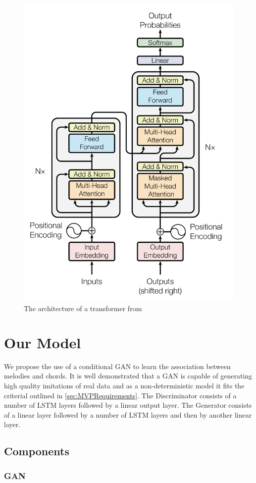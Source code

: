 \begin{figure}
    \centering
    \includegraphics[width=0.4\columnwidth]{Figures/Transformer}
    \decoRule
    \caption{The architecture of a transformer from \cite{Transformers}}
    \label{fig:Transformer}
\end{figure}

\section{Our Model}

We propose the use of a conditional GAN to learn the association between melodies and chords.
It is well demonstrated that a GAN is capable of generating high quality imitations of real data and as a non-deterministic model it fits the criterial outlined in \ref{sec:MVPRequirements}.
The Discriminator consists of a number of LSTM layers followed by a linear output layer.
The Generator consists of a linear layer followed by a number of LSTM layers and then by another linear layer.
\subsection{Components}

\subsubsection{GAN}
